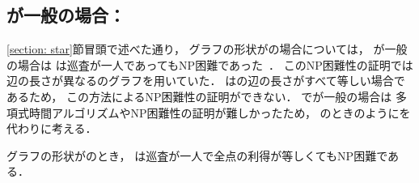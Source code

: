 \subsection{{\maxIdletime}が一般の場合：{\timeSpecifiedPatProb}}
\ref{section: star}節冒頭で述べた通り，
グラフの形状が{\graphStar}の場合については，
{\maxIdletime}が一般の場合は
{\patProb}は巡査が一人であってもNP困難であった~\cite[Theorem~6]{coene2011charlemagne}．
このNP困難性の証明では
辺の長さが異なる{\graphStar}のグラフを用いていた．
{\graphUnit}は{\graphStar}の辺の長さがすべて等しい場合であるため，
この方法によるNP困難性の証明ができない．
{\graphUnit}で{\maxIdletime}が一般の場合は
多項式時間アルゴリズムやNP困難性の証明が難しかったため，
{\graphLine}のときのように{\timeSpecifiedPatProb}を代わりに考える．


\begin{theo}
\label{theo:unit_exacidletime_NPhard}
グラフの形状が{\graphUnit}のとき，
{\timeSpecifiedPatProb}は巡査が一人で全点の利得が等しくてもNP困難である．
\end{theo}
